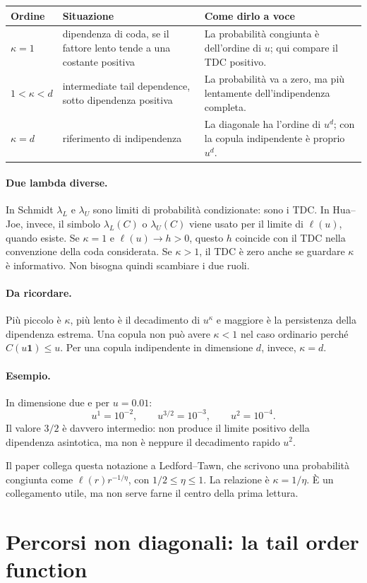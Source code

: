 \documentclass[11pt,a4paper]{article}
\newcommand{\one}{\boldsymbol{1}}
\newcommand{\Esempio}{\paragraph{Esempio.}}
\newcommand{\Ricorda}{\paragraph{Da ricordare.}}
\begin{document}
\begin{center}
\begin{tabular}{p{2.7cm}p{3.5cm}p{5.1cm}}
\toprule
Ordine & Situazione & Come dirlo a voce\\
\midrule
$\kappa=1$ & dipendenza di coda, se il fattore lento tende a una costante positiva & La probabilità congiunta è dell'ordine di $u$; qui compare il TDC positivo.\\
$1<\kappa<d$ & intermediate tail dependence, sotto dipendenza positiva & La probabilità va a zero, ma più lentamente dell'indipendenza completa.\\
$\kappa=d$ & riferimento di indipendenza & La diagonale ha l'ordine di $u^d$; con la copula indipendente è proprio $u^d$.\\
\bottomrule
\end{tabular}
\end{center}

\paragraph{Due lambda diverse.}
In Schmidt $\lambda_L$ e $\lambda_U$ sono limiti di probabilità condizionate:
sono i TDC. In Hua--Joe, invece, il simbolo $\lambda_L(C)$ o
$\lambda_U(C)$ viene usato per il limite di $\ell(u)$, quando esiste. Se
$\kappa=1$ e $\ell(u)\to h>0$, questo $h$ coincide con il TDC nella
convenzione della coda considerata. Se $\kappa>1$, il TDC è zero anche se
guardare $\kappa$ è informativo. Non bisogna quindi scambiare i due ruoli.

\Ricorda Più piccolo è $\kappa$, più lento è il decadimento di $u^\kappa$ e
maggiore è la persistenza della dipendenza estrema. Una copula non può avere
$\kappa<1$ nel caso ordinario perché $C(u\one)\leq u$. Per una copula
indipendente in dimensione $d$, invece, $\kappa=d$.

\Esempio In dimensione due e per $u=0.01$:
\[
 u^1=10^{-2},\qquad u^{3/2}=10^{-3},\qquad u^2=10^{-4}.
\]
Il valore $3/2$ è davvero intermedio: non produce il limite positivo della
dipendenza asintotica, ma non è neppure il decadimento rapido $u^2$.

Il paper collega questa notazione a Ledford--Tawn, che scrivono una probabilità
congiunta come $\ell(r)r^{-1/\eta}$, con $1/2\leq\eta\leq1$. La relazione è
$\kappa=1/\eta$. È un collegamento utile, ma non serve farne il centro della
prima lettura.

\section{Percorsi non diagonali: la tail order function}
\end{document}
